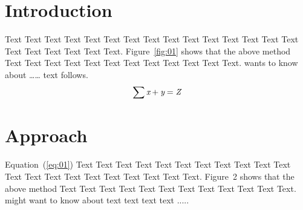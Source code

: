 \documentclass{bioinfo}
\begin{document}
    \maketitle


    \section{Introduction}

    Text Text Text Text Text Text Text Text Text Text Text Text Text
    Text Text Text Text Text Text Text Text. Figure~\ref{fig:01}
    shows that the above method Text Text Text Text Text Text Text
    Text Text Text Text Text.  \citep{Bag01} wants to know about
        {\ldots}{\ldots} text follows.
    \begin{equation}
        \sum \text{\it x}+ \text{\it y} =\text{\it Z}\label{eq:01}\vspace*{-10pt}
    \end{equation}



    \section{Approach}

    Equation~(\ref{eq:01}) Text Text Text Text Text Text Text Text
    Text Text Text Text Text Text Text Text Text Text Text Text Text.
    Figure~2\vphantom{\ref{fig:02}} shows that the above method Text
    Text Text Text Text Text Text Text Text Text Text Text.
    \citealp{Boffelli03} might want to know about text text text text
    .....
\end{document}
